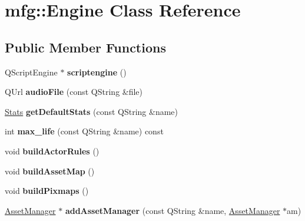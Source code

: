 \hypertarget{classmfg_1_1_engine}{}\section{mfg\+:\+:Engine Class Reference}
\label{classmfg_1_1_engine}
\subsection*{Public Member Functions}
\begin{DoxyCompactItemize}
\item 
\mbox{\label{classmfg_1_1_engine_a687d0b7b9c5744312b52925cc365249e}} 
Q\+Script\+Engine $\ast$ {\bfseries scriptengine} ()
\item 
\mbox{\label{classmfg_1_1_engine_a70efe8bcf90b5ffc41cbf3e3e11f1e19}} 
Q\+Url {\bfseries audio\+File} (const Q\+String \&file)
\item 
\mbox{\label{classmfg_1_1_engine_a268d9d9bf7bed17b80c0bd22bffd4d8c}} 
\hyperlink{structmfg_1_1_stats}{Stats} {\bfseries get\+Default\+Stats} (const Q\+String \&name)
\item 
\mbox{\label{classmfg_1_1_engine_a64ff2b62c87bd742495c1bbd11c1dba5}} 
int {\bfseries max\+\_\+life} (const Q\+String \&name) const
\item 
\mbox{\label{classmfg_1_1_engine_a5618e671129e7689e59a139be9dd1c3a}} 
void {\bfseries build\+Actor\+Rules} ()
\item 
\mbox{\label{classmfg_1_1_engine_a54ac63e738b56fcebde8b938f6564d37}} 
void {\bfseries build\+Asset\+Map} ()
\item 
\mbox{\label{classmfg_1_1_engine_aab8b2f5a5ef432825a3973e839a24d78}} 
void {\bfseries build\+Pixmaps} ()
\item 
\mbox{\label{classmfg_1_1_engine_af0d7f38782bda7e1582ca7b8605fdd63}} 
\hyperlink{class_asset_manager}{Asset\+Manager} $\ast$ {\bfseries add\+Asset\+Manager} (const Q\+String \&name, \hyperlink{class_asset_manager}{Asset\+Manager} $\ast$am)
\item 

\end{DoxyCompactItemize}
